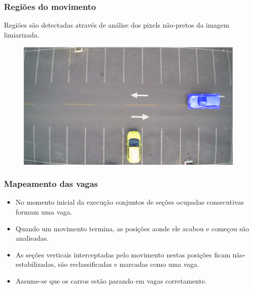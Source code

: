 \documentclass{beamer}
\begin{document}
\begin{frame}
\frametitle{Regiões do movimento}
\begin{block}{}
Regiões são detectadas através de análise dos pixels não-pretos da imagem limiarizada.
\end{block}

\begin{figure}
\centering
\includegraphics[width=.4\textwidth]{retanguloMovimento}
\centering
\end{figure}
\end{frame}

\begin{frame}
\frametitle{Mapeamento das vagas}
\begin{itemize}
\item No momento inicial da execução conjuntos de seções ocupadas consecutivas formam uma vaga.
\item Quando um movimento termina, as posições aonde ele acabou e começou são analisadas.
\item As seções verticais interceptadas pelo movimento nestas posições ficam não-estabilizadas, são reclassificadas e marcadas como uma vaga.
\item Assume-se que os carros estão parando em vagas corretamente.
\end{itemize}
\end{frame}

%
%
%
\end{document}
